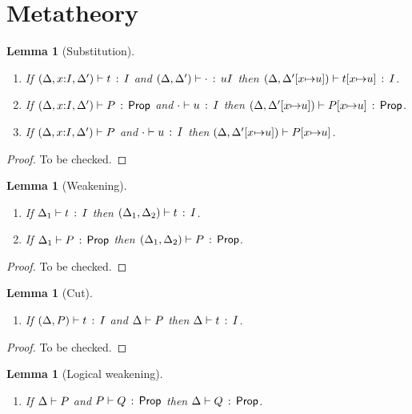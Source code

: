 \documentclass[10pt,letter]{article}
\newtheorem{lemma}[theorem]{Lemma}
\begin{document}
\clearpage

\section{Metatheory}

\begin{lemma}[Substitution]
\label{lemma:subst}
\mbox{}
 \begin{enumerate}
	\item If $(\Delta,x{:}I,\Delta') \vdash t\, :\, I$ and
	  $(\Delta,\Delta') \vdash \cdot\, :\, u{I}$ then
	  $(\Delta,\Delta'[x{\mapsto}u]) \vdash t[x{\mapsto}u]\, :\, I$.
	\item If $(\Delta,x{:}I,\Delta') \vdash P\, :\, \mathsf{Prop}$ and
	  $\cdot \vdash u\, :\, I$ then
	  $(\Delta,\Delta'[x{\mapsto}u]) \vdash P[x{\mapsto}u]\, :\, \mathsf{Prop}$.
	\item If $(\Delta,x{:}I,\Delta') \vdash P$ and
	  $\cdot \vdash u\, :\, I$ then
	  $(\Delta,\Delta'[x{\mapsto}u]) \vdash P[x{\mapsto}u]$.	
 \end{enumerate}
\end{lemma}

\begin{proof}
To be checked.
\end{proof}

\begin{lemma}[Weakening]
\mbox{}
\label{lemma:weaken}
\begin{enumerate}
	\item If $\Delta_1 \vdash t\, :\, I$ then
	   $(\Delta_1,\Delta_2) \vdash t\, :\, I$.
	\item If $\Delta_1 \vdash P\, :\, \mathsf{Prop}$ then
	   $(\Delta_1,\Delta_2) \vdash P\, :\, \mathsf{Prop}$.
\end{enumerate}
\end{lemma}

\begin{proof}
To be checked.
\end{proof}

\begin{lemma}[Cut]
\label{lemma:cut}
\mbox{}
\begin{enumerate}
  \item If $(\Delta,P) \vdash t\, :\, I$ and
     $\Delta \vdash P$ then
     $\Delta \vdash t\, :\, I$.
\end{enumerate}
\end{lemma}

\begin{proof}
To be checked.
\end{proof}

\begin{lemma}[Logical weakening]
\label{lemma:logweak}
\mbox{}
\begin{enumerate}
\item If $\Delta \vdash P$ and $P \vdash Q\, :\, \mathsf{Prop}$ then
  $\Delta \vdash Q\, :\, \mathsf{Prop}$.
\end{enumerate}
\end{lemma}
\end{document}
